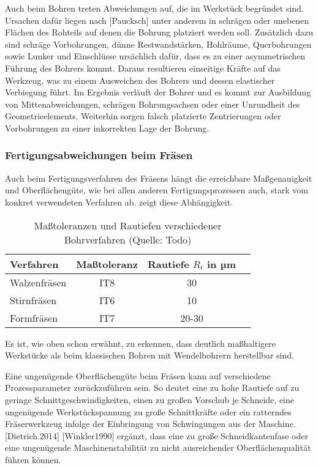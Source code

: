 Auch beim Bohren treten Abweichungen auf, die im Werkstück begründet sind. Ursachen dafür liegen nach [Paucksch] unter anderem in schrägen oder unebenen Flächen des Rohteils auf denen die Bohrung platziert werden soll. Zusätzlich dazu sind schräge Vorbohrungen, dünne Restwandstärken, Hohlräume, Querbohrungen sowie Lunker und Einschlüsse ursächlich dafür, dass es zu einer asymmetrischen Führung des Bohrers kommt. Daraus resultieren einseitige Kräfte auf das Werkzeug, was zu einem Ausweichen des Bohrers und dessen elastischer Verbiegung führt. Im Ergebnis verläuft der Bohrer und es kommt zur Ausbildung von Mittenabweichungen, schrägen Bohrungsachsen oder einer Unrundheit des Geometrieelements.
Weiterhin sorgen falsch platzierte Zentrierungen oder Vorbohrungen zu einer inkorrekten Lage der Bohrung.   

\subsubsection {Fertigungsabweichungen beim Fräsen}

Auch beim Fertigungsverfahren des Fräsens hängt die erreichbare Maßgenauigkeit und Oberflächengüte, wie bei allen anderen Fertigungsprozessen auch, stark vom konkret verwendeten Verfahren ab.  zeigt diese Abhängigkeit. 

 
 \begin{table}[h]	
 	
 	\begin{tabularx}{\columnwidth}{|X|c|c|l|}	
 		
 		
 		\hline
 		\textbf{Verfahren}&\textbf{Maßtoleranz}&\textbf{Rautiefe $R_{t}$ in µm}\\
 		\hline
 		Walzenfräsen&IT8&30\\
 		\hline
 		Stirnfräsen&IT6&10\\
 		\hline
 		Formfräsen&IT7&20-30\\
 		\hline
 		
 	\end{tabularx}
 	
 	\caption{Maßtoleranzen und Rautiefen verschiedener Bohrverfahren (Quelle: Todo)}
 	\label{tab:fraesqualität}
 	
 \end{table}

Es ist, wie oben schon erwähnt, zu erkennen, dass deutlich maßhaltigere Werkstücke als beim klassischen Bohren mit Wendelbohrern herstellbar sind. 

Eine ungenügende Oberflächengüte beim Fräsen kann auf verschiedene Prozessparameter zurückzuführen sein. So deutet eine zu hohe Rautiefe auf zu geringe Schnittgeschwindigkeiten, einen zu großen Vorschub je Schneide, eine ungenügende Werkstückspannung zu große Schnittkräfte oder ein ratterndes Fräserwerkzeug infolge der Einbringung von Schwingungen aus der Maschine. [Dietrich.2014]
[Winkler1990] ergänzt, dass eine zu große Schneidkantenfase oder eine ungenügende Maschinenstabilität zu nicht ausreichender Oberflächenqualität führen können. 

